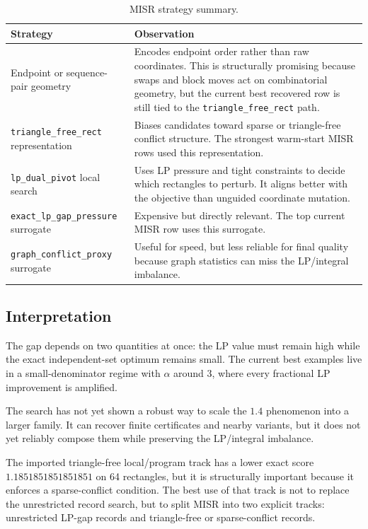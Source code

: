 \documentclass[11pt]{article}
\newcommand{\code}[1]{\texttt{#1}}
\begin{document}
\begin{table}[htbp]
\centering
\caption{MISR strategy summary.}
\begin{tabularx}{\textwidth}{p{}X}
\toprule
Strategy & Observation \\
\midrule
Endpoint or sequence-pair geometry & Encodes endpoint order rather than raw
coordinates.  This is structurally promising because swaps and block moves act
on combinatorial geometry, but the current best recovered row is still tied to
the \code{triangle\_free\_rect} path. \\
\code{triangle\_free\_rect} representation & Biases candidates toward sparse
or triangle-free conflict structure.  The strongest warm-start MISR rows used
this representation. \\
\code{lp\_dual\_pivot} local search & Uses LP pressure and tight constraints
to decide which rectangles to perturb.  It aligns better with the objective
than unguided coordinate mutation. \\
\code{exact\_lp\_gap\_pressure} surrogate & Expensive but directly relevant.
The top current MISR row uses this surrogate. \\
\code{graph\_conflict\_proxy} surrogate & Useful for speed, but less reliable
for final quality because graph statistics can miss the LP/integral imbalance. \\
\bottomrule
\end{tabularx}
\end{table}

\subsection{Interpretation}

The gap depends on two quantities at once: the LP value must remain high while
the exact independent-set optimum remains small.  The current best examples
live in a small-denominator regime with $\alpha$ around 3, where every
fractional LP improvement is amplified.

The search has not yet shown a robust way to scale the $1.4$ phenomenon into a
larger family.  It can recover finite certificates and nearby variants, but it
does not yet reliably compose them while preserving the LP/integral imbalance.

The imported triangle-free local/program track has a lower exact score
$1.1851851851851851$ on 64 rectangles, but it is structurally important because
it enforces a sparse-conflict condition.  The best use of that track is not to
replace the unrestricted record search, but to split MISR into two explicit
tracks: unrestricted LP-gap records and triangle-free or sparse-conflict
records.
\end{document}
